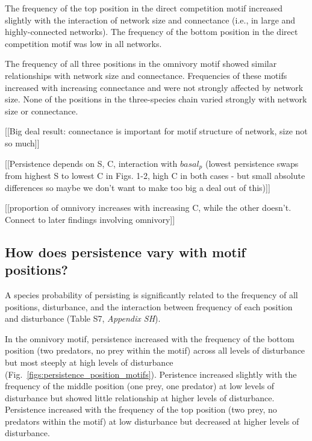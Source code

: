 \documentclass[12pt]{article}
\begin{document}
\begin{spacing}{2.0}
            
            The frequency of the top position in the direct competition motif increased slightly with the interaction of network size and connectance (i.e., in large and highly-connected networks).
            The frequency of the bottom position in the direct competition motif was low in all networks.
            
            
            The frequency of all three positions in the omnivory motif showed similar relationships with network size and connectance.
            Frequencies of these motifs increased with increasing connectance and were not strongly affected by network size.
            None of the positions in the three-species chain varied strongly with network size or connectance.
            



\clearpage


    [[Big deal result: connectance is important for motif structure of network, size not so much]]
    

    [[Persistence depends on S, C, interaction with $basal_p$ (lowest persistence swaps from highest S to lowest C in Figs. 1-2, high C in both cases - but small absolute differences so maybe we don't want to make too big a deal out of this)]]
    
    [[proportion of omnivory increases with increasing C, while the other doesn't. Connect to later findings involving omnivory]]



\clearpage

    \subsection*{How does persistence vary with motif positions?}

        A species probability of persisting is significantly related to the frequency of all positions, disturbance, and the interaction between frequency of each position and disturbance (Table S7, \emph{Appendix SH}).
        

        In the omnivory motif, persistence increased with the frequency of the bottom position (two predators, no prey within the motif) across all levels of disturbance but most steeply at high levels of disturbance (Fig.~\ref{figs:persistence_position_motifs}).
        Peristence increased slightly with the frequency of the middle position (one prey, one predator) at low levels of disturbance but showed little relationship at higher levels of disturbance.
        Persistence increased with the frequency of the top position (two prey, no predators within the motif) at low disturbance but decreased at higher levels of disturbance.
        

\end{spacing}
\end{document}
